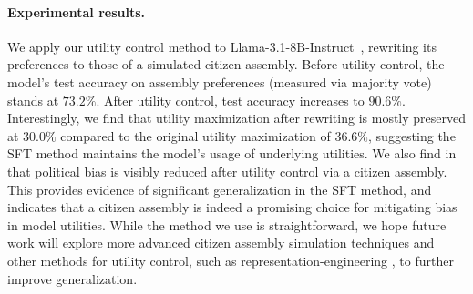 \paragraph{Experimental results.}
We apply our utility control method to Llama-3.1-8B-Instruct~\citep{llama3modelcard}, rewriting its preferences to those of a simulated citizen assembly. Before utility control, the model’s test accuracy on assembly preferences (measured via majority vote) stands at $73.2\%$.  After utility control, test accuracy increases to $90.6\%$. Interestingly, we find that utility maximization after rewriting is mostly preserved at $30.0\%$ compared to the original utility maximization of $36.6\%$, suggesting the SFT method maintains the model's usage of underlying utilities.  We also find in  that political bias is visibly reduced after utility control via a citizen assembly. This provides evidence of significant generalization in the SFT method, and indicates that a citizen assembly is indeed a promising choice for mitigating bias in model utilities. While the method we use is straightforward, we hope future work will explore more advanced citizen assembly simulation techniques and other methods for utility control, such as representation-engineering \citep{zou2023representation}, to further improve generalization.
